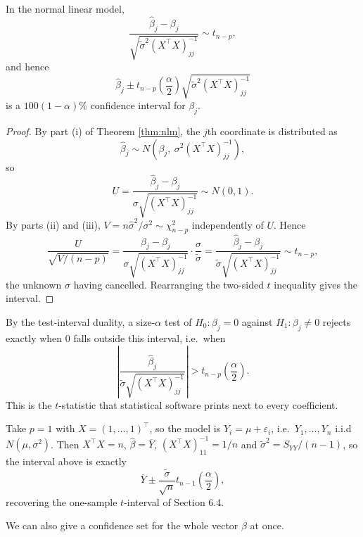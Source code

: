 \begin{proposition}
  In the normal linear model,
  $$
  \frac{\hat\beta_j - \beta_j}{\sqrt{\tilde\sigma^2\left(X^\top X\right)^{-1}_{jj}}}\sim t_{n-p},
  $$
  and hence
  $$
  \hat\beta_j \pm t_{n-p}\!\left(\frac\alpha2\right)\sqrt{\tilde\sigma^2\left(X^\top X\right)^{-1}_{jj}}
  $$
  is a $100(1-\alpha)\%$ confidence interval for $\beta_j$.
\end{proposition}
\begin{proof}
  By part (i) of Theorem \ref{thm:nlm}, the $j$th coordinate is distributed as
  $$
  \hat\beta_j \sim N\left(\beta_j,\ \sigma^2(X^\top X)^{-1}_{jj}\right),
  $$
  so
  $$
  U = \frac{\hat\beta_j - \beta_j}{\sigma\sqrt{(X^\top X)^{-1}_{jj}}} \sim N(0,1).
  $$
  By parts (ii) and (iii), $V = n\hat\sigma^2/\sigma^2 \sim \chi^2_{n-p}$ independently of $U$. Hence
  $$
  \frac{U}{\sqrt{V/(n-p)}} = \frac{\hat\beta_j-\beta_j}{\sigma\sqrt{(X^\top X)^{-1}_{jj}}}\cdot\frac{\sigma}{\tilde\sigma} = \frac{\hat\beta_j-\beta_j}{\tilde\sigma\sqrt{(X^\top X)^{-1}_{jj}}}\sim t_{n-p},
  $$
  the unknown $\sigma$ having cancelled. Rearranging the two-sided $t$ inequality gives the interval.
\end{proof}

By the test-interval duality, a size-$\alpha$ test of $H_0 : \beta_j = 0$ against $H_1 : \beta_j \neq 0$ rejects exactly when $0$ falls outside this interval, i.e.\ when
$$
\left|\frac{\hat\beta_j}{\tilde\sigma\sqrt{(X^\top X)^{-1}_{jj}}}\right| > t_{n-p}\!\left(\frac\alpha2\right).
$$
This is the $t$-statistic that statistical software prints next to every coefficient.

\begin{example}
  Take $p = 1$ with $X = (1,\dots,1)^\top$, so the model is $Y_i = \mu + \varepsilon_i$, i.e.\ $Y_1,\dots,Y_n$ i.i.d $N(\mu,\sigma^2)$. Then $X^\top X = n$, $\hat\beta = \overline{Y}$, $(X^\top X)^{-1}_{11} = 1/n$ and $\tilde\sigma^2 = S_{YY}/(n-1)$, so the interval above is exactly
  $$
  \overline{Y}\pm\frac{\tilde\sigma}{\sqrt n}t_{n-1}\!\left(\frac\alpha2\right),
  $$
  recovering the one-sample $t$-interval of Section 6.4.
\end{example}

We can also give a confidence set for the whole vector $\beta$ at once.

